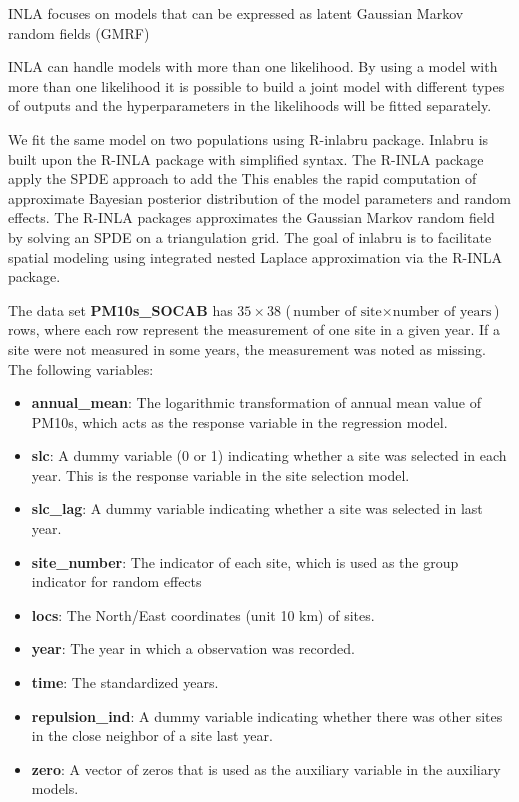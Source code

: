 INLA focuses on models that can be expressed as latent Gaussian Markov random fields (GMRF)

INLA can handle models with more than one likelihood. By using a model with more than one likelihood it is possible to build a joint model with different types of outputs and the hyperparameters in the likelihoods will be fitted separately.

We fit the same model on two populations using R-inlabru package. Inlabru is built upon the R-INLA 
package with simplified syntax. The R-INLA package apply the SPDE approach to add the
This enables the rapid computation of approximate Bayesian posterior distribution of the model 
parameters and random effects. The R-INLA packages approximates the Gaussian Markov random field by
solving an SPDE on a triangulation grid.
The goal of inlabru is to facilitate spatial modeling using integrated nested Laplace approximation via the R-INLA package.

The data set \textbf{PM10s\_SOCAB} has $35 \times 38$ ($\text{number of site} \times \text{number of years}$) 
rows, where each row represent the measurement of one site in a given year. If a site were not
measured in some years, the measurement was noted as missing.  The following variables:
\begin{itemize}
	\item \textbf{annual\_mean}: The logarithmic transformation of annual mean value of PM10s, which acts as the response variable in the regression model.
	\item \textbf{slc}: A dummy variable (0 or 1) indicating whether a site was selected in each year.
	This is the response variable in the site selection model.
	\item \textbf{slc\_lag}: A dummy variable indicating whether a site was selected in last year.
	\item \textbf{site\_number}: The indicator of each site, which is used as the group indicator for random effects
	\item \textbf{locs}: The North/East coordinates (unit 10 km) of sites.
	\item \textbf{year}: The year in which a observation was recorded.
	\item \textbf{time}: The standardized years. 
	\item \textbf{repulsion\_ind}: A dummy variable indicating whether there was other sites in the close neighbor of a site last year.
	\item \textbf{zero}: A vector of zeros that is used as the auxiliary variable in the auxiliary models.
\end{itemize}

